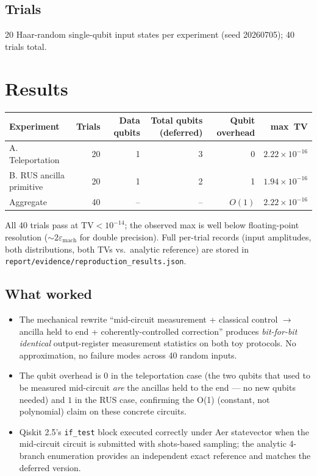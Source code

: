 \documentclass[11pt]{article}
\begin{document}
\subsection{Trials}
20 Haar-random single-qubit input states per experiment (seed 20260705); 40 trials total.

\section{Results}\label{sec:results}
\begin{center}
\begin{tabular}{@{}lrrrrr@{}}\toprule
Experiment & Trials & Data qubits & Total qubits (deferred) & Qubit overhead & max~TV \\ \midrule
A. Teleportation           & 20 & 1 & 3 & 0 & $2.22\times 10^{-16}$ \\
B. RUS ancilla primitive   & 20 & 1 & 2 & 1 & $1.94\times 10^{-16}$ \\ \midrule
Aggregate                  & 40 & --& --& $O(1)$ & $2.22\times 10^{-16}$ \\
\bottomrule\end{tabular}
\end{center}
All 40 trials pass at $\mathrm{TV} < 10^{-14}$; the observed max is well below floating-point
resolution ($\sim 2\varepsilon_{\mathrm{mach}}$ for double precision).  Full per-trial records
(input amplitudes, both distributions, both TVs vs.\ analytic reference) are stored in
\texttt{report/evidence/reproduction\_results.json}.

\subsection{What worked}
\begin{itemize}
  \item The mechanical rewrite ``mid-circuit measurement + classical control $\to$ ancilla held to end
        + coherently-controlled correction'' produces \emph{bit-for-bit identical} output-register
        measurement statistics on both toy protocols.  No approximation, no failure modes across
        40 random inputs.
  \item The qubit overhead is $0$ in the teleportation case (the two qubits that used to be
        measured mid-circuit \emph{are} the ancillas held to the end --- no new qubits needed)
        and $1$ in the RUS case, confirming the O(1) (constant, not polynomial) claim on
        these concrete circuits.
  \item Qiskit 2.5's \texttt{if\_test} block executed correctly under Aer statevector when the
        mid-circuit circuit is submitted with shots-based sampling; the analytic 4-branch
        enumeration provides an independent exact reference and matches the deferred version.
\end{itemize}
\end{document}
